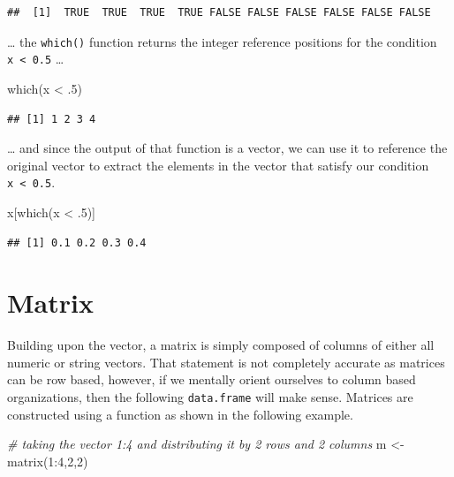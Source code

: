 \documentclass[
]{book}
\newenvironment{Shaded}{\begin{snugshade}}{\end{snugshade}}
\newcommand{\CommentTok}[1]{\textcolor[rgb]{0.56,0.35,0.01}{\textit{#1}}}
\newcommand{\DecValTok}[1]{\textcolor[rgb]{0.00,0.00,0.81}{#1}}
\newcommand{\FunctionTok}[1]{\textcolor[rgb]{0.00,0.00,0.00}{#1}}
\newcommand{\NormalTok}[1]{#1}
\newcommand{\OtherTok}[1]{\textcolor[rgb]{0.56,0.35,0.01}{#1}}
\newcommand{\SpecialCharTok}[1]{\textcolor[rgb]{0.00,0.00,0.00}{#1}}
\begin{document}
\begin{verbatim}
##  [1]  TRUE  TRUE  TRUE  TRUE FALSE FALSE FALSE FALSE FALSE FALSE
\end{verbatim}

\ldots{} the \texttt{which()} function returns the integer reference positions for the condition \texttt{x\ \textless{}\ 0.5} \ldots{}

\begin{Shaded}
\begin{Highlighting}[]
\FunctionTok{which}\NormalTok{(x }\SpecialCharTok{\textless{}}\NormalTok{ .}\DecValTok{5}\NormalTok{)}
\end{Highlighting}
\end{Shaded}

\begin{verbatim}
## [1] 1 2 3 4
\end{verbatim}

\ldots{} and since the output of that function is a vector, we can use it to reference the original vector to extract the elements in the vector that satisfy our condition \texttt{x\ \textless{}\ 0.5}.

\begin{Shaded}
\begin{Highlighting}[]
\NormalTok{x[}\FunctionTok{which}\NormalTok{(x }\SpecialCharTok{\textless{}}\NormalTok{ .}\DecValTok{5}\NormalTok{)]}
\end{Highlighting}
\end{Shaded}

\begin{verbatim}
## [1] 0.1 0.2 0.3 0.4
\end{verbatim}

\hypertarget{matrix}{%
\section{Matrix}\label{matrix}}

Building upon the vector, a matrix is simply composed of columns of either all numeric or string vectors. That statement is not completely accurate as matrices can be row based, however, if we mentally orient ourselves to column based organizations, then the following \texttt{data.frame} will make sense. Matrices are constructed using a function as shown in the following example.

\begin{Shaded}
\begin{Highlighting}[]
\CommentTok{\# taking the vector 1:4 and distributing it by 2 rows and 2 columns}
\NormalTok{m }\OtherTok{\textless{}{-}} \FunctionTok{matrix}\NormalTok{(}\DecValTok{1}\SpecialCharTok{:}\DecValTok{4}\NormalTok{,}\DecValTok{2}\NormalTok{,}\DecValTok{2}\NormalTok{)}
\end{Highlighting}
\end{Shaded}
\end{document}
